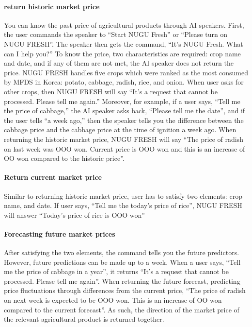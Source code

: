 \documentclass[conference]{IEEEtran}
\begin{document}
\paragraph{return historic market price}
You can know the past price of agricultural products through AI speakers. First, the user commands the speaker to “Start NUGU Fresh” or “Please turn on NUGU FRESH”. The speaker then gets the command, “It’s NUGU Fresh. What can I help you?” To know the price, two characteristics are required: crop name and date, and if any of them are not met, the AI speaker does not return the price. NUGU FRESH handles five crops which were ranked as the most consumed by  MFDS in Korea: potato, cabbage, radish, rice, and onion. When user asks for other crops, then NUGU FRESH will say “It’s a request that cannot be processed. Please tell me again.” Moreover, for example, if a user says, “Tell me the price of cabbage,” the AI speaker asks back, “Please tell me the date”, and if the user tells “a week ago,” then the speaker tells you the difference between the cabbage price and the cabbage price at the time of ignition a week ago. When returning the historic market price, NUGU FRESH will say “The price of radish on last week was OOO won. Current price is OOO won and this is an increase of OO won compared to the historic price”.
\paragraph{Return current market price}
Similar to returning historic market price, user has to satisfy two elements: crop name, and date. If user says, “Tell me the today’s price of rice”, NUGU FRESH will answer “Today’s price of rice is OOO won”

\paragraph{Forecasting future market prices}
After satisfying the two elements, the command tells you the future predictors. However, future predictions can be made up to a week. When a user says, “Tell me the price of cabbage in a year”, it returns “It’s a request that cannot be processed. Please tell me again”. When returning the future forecast, predicting price fluctuations through differences from the current price, “The price of radish on next week is expected to be OOO won. This is an increase of OO won compared to the current forecast”.  As such, the direction of the market price of the relevant agricultural product is returned together.
\end{document}
